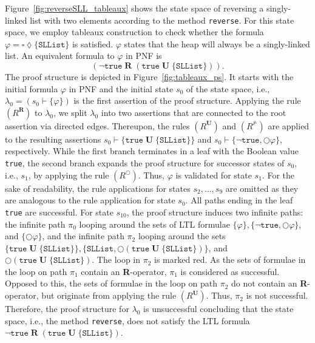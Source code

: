 \documentclass[a4paper, 12pt, twoside]{report}
\begin{document}
	Figure~\ref{fig:reverseSLL_tableaux} shows the state space of reversing a singly-linked list with two elements according to the method \texttt{reverse}. For this state space, we employ tableaux construction to check whether the formula $\varphi=\square \lozenge \{\texttt{SLList}\}$ is satisfied. $\varphi$ states that the heap will always be a singly-linked list. An equivalent formula to $\varphi$ in PNF is \[(\neg \texttt{true}\;\textbf{R}\;(\texttt{true}\;\textbf{U}\;\{\texttt{SLList}\})).\] The proof structure is depicted in Figure~\ref{fig:tableaux_ps}. It starts with the initial formula $\varphi$ in PNF and the initial state $s_0$ of the state space, i.e., $\lambda_0 = (s_0 \vdash \{\varphi\})$ is the first assertion of the proof structure. Applying the rule $(R^{\textbf{R}})$ to $\lambda_0$, we split $\lambda_0$ into two assertions that are connected to the root assertion via directed edges. Thereupon, the rules $(R^{\textbf{U}})$ and $(R^{\nvDash})$ are applied to the resulting assertions $s_0 \vdash \{\texttt{true}\;\textbf{U}\;\{\texttt{SLList}\}\}$ and  $s_0 \vdash \{\neg\texttt{true}, \bigcirc\varphi\}$, respectively. While the first branch terminates in a leaf with the Boolean value \texttt{true}, the second branch expands the proof structure for successor states of $s_0$, i.e., $s_1$, by applying the rule $(R^{\bigcirc})$. Thus, $\varphi$ is validated for state $s_1$. For the sake of readability, the rule applications for states $s_2, \dots, s_9$ are omitted as they are analogous to the rule application for state $s_0$. All paths ending in the leaf \texttt{true} are successful. For state $s_{10}$, the proof structure induces two infinite paths: the infinite path $\pi_0$ looping around the sets of LTL formulae $\{\varphi\}, \{\neg\texttt{true},\bigcirc\varphi\}$, and $\{\bigcirc\varphi\}$, and the infinite path $\pi_2$ looping around the sets $\{\texttt{true}\;\textbf{U}\;\{\texttt{SLList}\}\},\{\texttt{SLList}, \bigcirc(\texttt{true}\;\textbf{U}\;\{\texttt{SLList}\})\}$, and $\bigcirc(\texttt{true}\;\textbf{U}\;\{\texttt{SLList}\})$. The loop in $\pi_2$ is marked red. As the sets of formulae in the loop on path $\pi_1$ contain an \textbf{R}-operator, $\pi_1$ is considered as successful. Opposed to this, the sets of formulae in the loop on path $\pi_2$ do not contain an \textbf{R}-operator, but originate from applying the rule $(R^{\textbf{U}})$. Thus, $\pi_2$ is not successful. Therefore, the proof structure for $\lambda_0$ is unsuccessful concluding that the state space, i.e., the method \texttt{reverse}, does not satisfy the LTL formula $\neg\texttt{true}\;\textbf{R}\;(\texttt{true}\;\textbf{U}\;\{\texttt{SLList}\})$.\\
	
\end{document}
